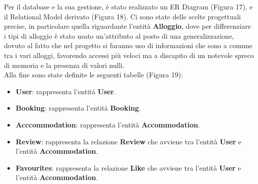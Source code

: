 \documentclass[10pt]{article}
\begin{document}
Per il database e la sua gestione, è stato realizzato un ER Diagram (Figura 17), e il Relational Model derivato (Figura 18). Ci sono state delle scelte progettuali precise, in particolare quella riguardante l'entità \textbf{Alloggio}, dove per differenziare i tipi di alloggio è stato usato un'attributo al posto di una generalizzazione, dovuto al fatto che nel progetto si faranno uso di informazioni che sono a comune tra i vari alloggi, favorendo accessi più veloci ma a discapito di un notevole spreco di memoria e la presenza di valori nulli.\\
Alla fine sono state definite le seguenti tabelle (Figura 19):
\begin{itemize}
\item \textbf{User}: rappresenta l'entità \textbf{User}.
\item \textbf{Booking}: rappresenta l'entità \textbf{Booking}.
\item \textbf{Acccommodation}: rappresenta l'entità \textbf{Accommodation}.
\item \textbf{Review}: rappresenta la relazione \textbf{Review} che avviene tra l'entità \textbf{User} e l'entità \textbf{Accommodation}.
\item \textbf{Favourites}: rappresenta la relazione \textbf{Like} che avviene tra l'entità \textbf{User} e l'entità \textbf{Accommodation}.
\end{itemize}
\end{document}
